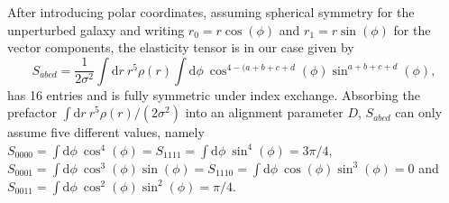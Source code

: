 \documentclass[a4paper,fleqn,usenatbib]{mnras}
\newcommand{\dd}{\mathrm{d}}
\begin{document}
After introducing polar coordinates, assuming spherical symmetry for the unperturbed galaxy and writing $r_0=r\cos(\phi)$ and $r_1=r\sin(\phi)$ for the vector components, the elasticity tensor is in our case given by
\begin{equation}
S_{abcd} = 
\frac{1}{2\sigma^2}\int\dd r\:r^5\rho(r)\int\dd\phi\:\cos^{4-(a+b+c+d}(\phi)\sin^{a+b+c+d}(\phi),
\end{equation}
has 16 entries and is fully symmetric under index exchange. Absorbing the prefactor $\int\dd r\:r^5\rho(r)/(2\sigma^2)$ into an alignment parameter $D$, $S_{abcd}$ can only assume five different values, namely $S_{0000} = \int\dd\phi\:\cos^4(\phi) = S_{1111} = \int\dd\phi\:\sin^4(\phi) = 3\pi/4$, $S_{0001} = \int\dd\phi\:\cos^3(\phi)\sin(\phi) = S_{1110} = \int\dd\phi\:\cos(\phi)\sin^3(\phi) = 0$ and $S_{0011} = \int\dd\phi\:\cos^2(\phi)\sin^2(\phi) = \pi/4$. 
\end{document}
